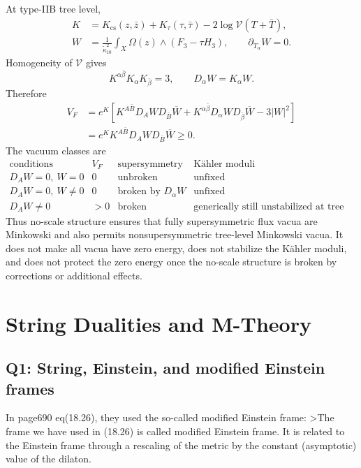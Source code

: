 \documentclass[
  10pt,
  a4paper,
  openany]{book}
\begin{document}
At type-IIB tree level, \[
\begin{aligned}
K
&=K_{\mathrm{cs}}(z,\bar z)
+K_\tau(\tau,\bar\tau)
-2\log\mathcal V(T+\bar T),\\
W
&=\frac{1}{\tilde\kappa_{10}^2}
\int_X\Omega(z)\wedge(F_3-\tau H_3),
\qquad
\partial_{T_\alpha}W=0.
\end{aligned}
\] Homogeneity of \(\mathcal V\) gives \[
\boxed{
K^{\alpha\bar\beta}K_\alpha K_{\bar\beta}=3,
\qquad
D_\alpha W=K_\alpha W.
}
\] Therefore \[
\boxed{
\begin{aligned}
V_F
&=e^K\left[
K^{A\bar B}D_AW D_{\bar B}\overline W
+K^{\alpha\bar\beta}D_\alpha W
D_{\bar\beta}\overline W
-3|W|^2
\right]\\
&=e^K K^{A\bar B}D_AW
D_{\bar B}\overline W
\geq0.
\end{aligned}
}
\] The vacuum classes are \[
\boxed{
\begin{array}{c|c|c|c}
\text{conditions}
&V_F
&\text{supersymmetry}
&\text{Kähler moduli}\\ \hline
D_AW=0,\ W=0
&0
&\text{unbroken}
&\text{unfixed}\\
D_AW=0,\ W\neq0
&0
&\text{broken by }D_\alpha W
&\text{unfixed}\\
D_AW\neq0
&>0
&\text{broken}
&\text{generically still unstabilized at tree level}
\end{array}
}
\] Thus no-scale structure ensures that fully supersymmetric flux vacua
are Minkowski and also permits nonsupersymmetric tree-level Minkowski
vacua. It does not make all vacua have zero energy, does not stabilize
the Kähler moduli, and does not protect the zero energy once the
no-scale structure is broken by corrections or additional effects.

\chapter{String Dualities and
M-Theory}\label{string-dualities-and-m-theory-1}

\section{Q1: String, Einstein, and modified Einstein
frames}\label{q1-string-einstein-and-modified-einstein-frames}

In page690 eq(18.26), they used the so-called modified Einstein frame:
\textgreater The frame we have used in (18.26) is called modified
Einstein frame. It is related to the Einstein frame through a rescaling
of the metric by the constant (asymptotic) value of the dilaton.
\end{document}
